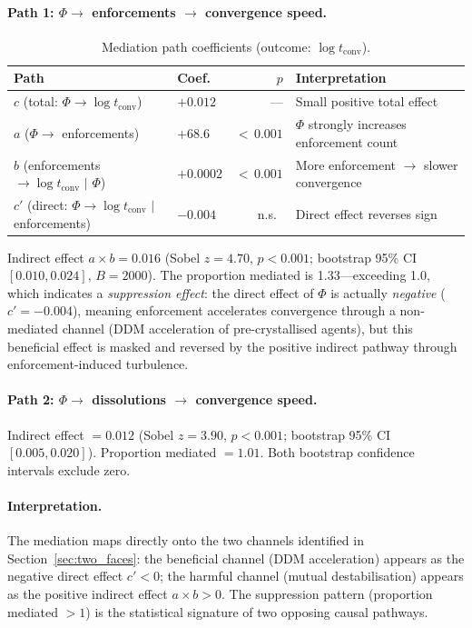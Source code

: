 \documentclass[11pt,a4paper]{article}
\begin{document}
\paragraph{Path 1: $\Phi \to$ enforcements $\to$ convergence speed.}

\begin{table}[H]
\centering
\caption{Mediation path coefficients (outcome: $\log t_{\mathrm{conv}}$).}
\label{tab:mediation}
\begin{tabular}{@{}llrl@{}}
\toprule
Path & Coef.\ & $p$ & Interpretation \\
\midrule
$c$ (total: $\Phi \to \log t_{\mathrm{conv}}$) & $+0.012$ & --- & Small positive total effect \\
$a$ ($\Phi \to$ enforcements) & $+68.6$ & ${<}\,0.001$ & $\Phi$ strongly increases enforcement count \\
$b$ (enforcements $\to \log t_{\mathrm{conv}}$ $\mid$ $\Phi$) & $+0.0002$ & ${<}\,0.001$ & More enforcement $\to$ slower convergence \\
$c'$ (direct: $\Phi \to \log t_{\mathrm{conv}}$ $\mid$ enforcements) & $-0.004$ & n.s.\ & Direct effect reverses sign \\
\bottomrule
\end{tabular}
\end{table}

\noindent Indirect effect $a \times b = 0.016$ (Sobel $z = 4.70$, $p < 0.001$; bootstrap 95\% CI $[0.010, 0.024]$, $B = 2000$). The proportion mediated is 1.33---exceeding 1.0, which indicates a \emph{suppression effect}: the direct effect of $\Phi$ is actually \emph{negative} ($c' = -0.004$), meaning enforcement accelerates convergence through a non-mediated channel (DDM acceleration of pre-crystallised agents), but this beneficial effect is masked and reversed by the positive indirect pathway through enforcement-induced turbulence.

\paragraph{Path 2: $\Phi \to$ dissolutions $\to$ convergence speed.}

\noindent Indirect effect $= 0.012$ (Sobel $z = 3.90$, $p < 0.001$; bootstrap 95\% CI $[0.005, 0.020]$). Proportion mediated $= 1.01$. Both bootstrap confidence intervals exclude zero.

\paragraph{Interpretation.} The mediation maps directly onto the two channels identified in Section~\ref{sec:two_faces}: the beneficial channel (DDM acceleration) appears as the negative direct effect $c' < 0$; the harmful channel (mutual destabilisation) appears as the positive indirect effect $a \times b > 0$. The suppression pattern (proportion mediated $> 1$) is the statistical signature of two opposing causal pathways.
\end{document}
